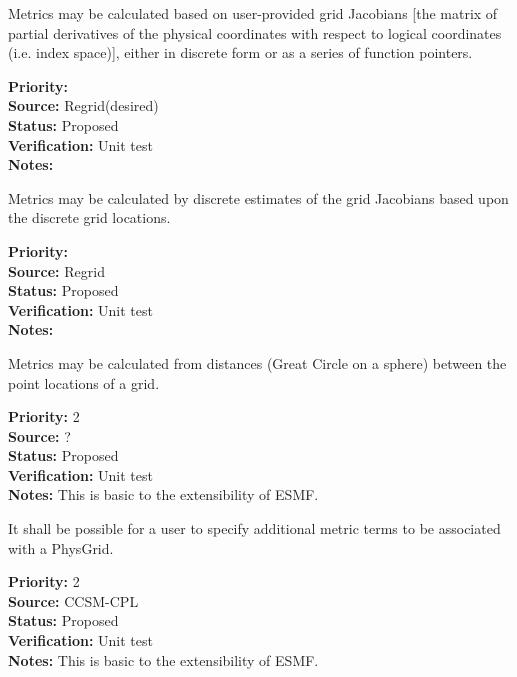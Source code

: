Metrics may be calculated based on user-provided grid Jacobians [the matrix of
partial derivatives of the physical coordinates with respect to logical
coordinates (i.e. index space)], either in discrete form or as a series of function pointers.
\begin{reqlist}
{\bf Priority:}  \\
{\bf Source:} Regrid(desired) \\
{\bf Status:} Proposed \\
{\bf Verification:} Unit test \\
{\bf Notes:} 
\end{reqlist}

Metrics may be calculated by discrete estimates of the grid Jacobians based upon
the discrete grid locations.
\begin{reqlist}
{\bf Priority:}  \\
{\bf Source:} Regrid \\
{\bf Status:} Proposed \\
{\bf Verification:} Unit test \\
{\bf Notes:}
\end{reqlist}

Metrics may be calculated from distances (Great Circle on a sphere) between
the point locations of a grid.
\begin{reqlist}
{\bf Priority:} 2 \\
{\bf Source:} ? \\
{\bf Status:} Proposed \\
{\bf Verification:} Unit test \\
{\bf Notes:} This is basic to the extensibility of ESMF. 
\end{reqlist}

It shall be possible for a user to specify additional metric terms to be associated
with a PhysGrid.
\begin{reqlist}
{\bf Priority:} 2 \\
{\bf Source:} CCSM-CPL \\
{\bf Status:} Proposed \\
{\bf Verification:} Unit test \\
{\bf Notes:} This is basic to the extensibility of ESMF. 
\end{reqlist}



